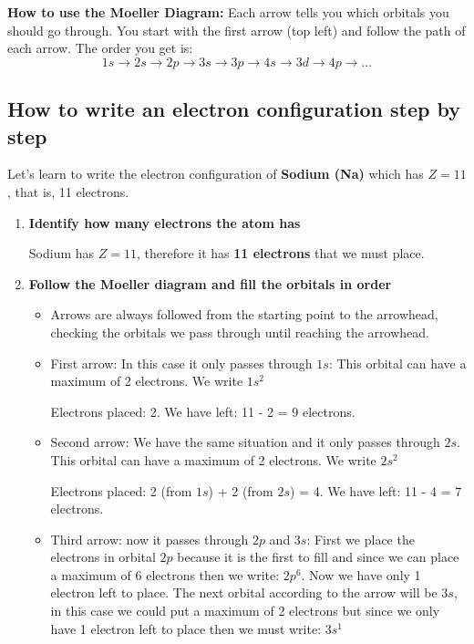 \begin{remark}
    \textbf{How to use the Moeller Diagram:} Each arrow tells you which orbitals you should go through. You start with the first arrow (top left) and follow the path of each arrow. The order you get is:
    \[
        1s \rightarrow 2s \rightarrow 2p \rightarrow 3s \rightarrow 3p \rightarrow 4s \rightarrow 3d \rightarrow 4p \rightarrow ...
    \]
\end{remark}
\subsection{How to write an electron configuration step by step}
Let's learn to write the electron configuration of \textbf{Sodium (Na)} which has \( Z = 11 \), that is, 11 electrons.
\begin{enumerate}[label=\textbf{Step \arabic*:}]
        \item \textbf{Identify how many electrons the atom has}

        Sodium has \( Z = 11 \), therefore it has \textbf{11 electrons} that we must place.

        \item \textbf{Follow the Moeller diagram and fill the orbitals in order}

        \begin{itemize}
            \item Arrows are always followed from the starting point to the arrowhead, checking the orbitals we pass through until reaching the arrowhead.

            \item First arrow: In this case it only passes through \( 1s \): This orbital can have a maximum of 2 electrons. We write \( 1s^2 \)

            Electrons placed: 2. We have left: 11 - 2 = 9 electrons.

            \item Second arrow: We have the same situation and it only passes through \( 2s \). This orbital can have a maximum of 2 electrons. We write \( 2s^2 \)

            Electrons placed: 2 (from \( 1s \)) + 2 (from \( 2s \)) = 4. We have left: 11 - 4 = 7 electrons.

            \item Third arrow: now it passes through \( 2p \) and \( 3s \): First we place the electrons in orbital \( 2p \) because it is the first to fill and since we can place a maximum of \num{6} electrons then we write: \( 2p^6 \). Now we have only 1 electron left to place. The next orbital according to the arrow will be \( 3s \), in this case we could put a maximum of \num{2} electrons but since we only have \num{1} electron left to place then we must write: \( 3s^1 \)


\end{itemize}
\end{enumerate}
